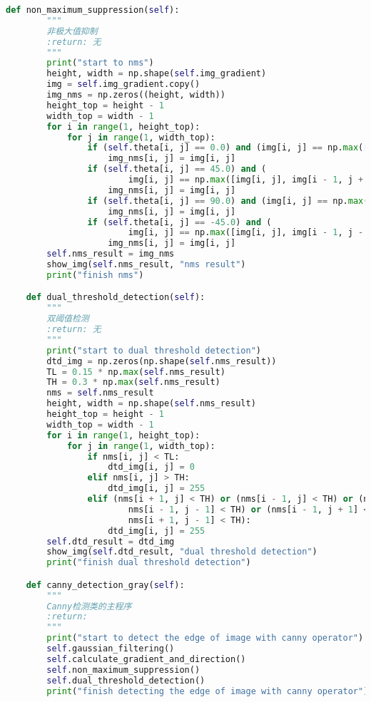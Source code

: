 \documentclass{hitreport}
\begin{document}
\begin{appendices}
\begin{lstlisting}[language=python]
    def non_maximum_suppression(self):
        """
        非极大值抑制
        :return: 无
        """
        print("start to nms")
        height, width = np.shape(self.img_gradient)
        img = self.img_gradient.copy()
        img_nms = np.zeros((height, width))
        height_top = height - 1
        width_top = width - 1
        for i in range(1, height_top):
            for j in range(1, width_top):
                if (self.theta[i, j] == 0.0) and (img[i, j] == np.max([img[i, j], img[i + 1, j], img[i - 1, j]])):
                    img_nms[i, j] = img[i, j]
                if (self.theta[i, j] == 45.0) and (
                        img[i, j] == np.max([img[i, j], img[i - 1, j + 1], img[i + 1, j - 1]])):
                    img_nms[i, j] = img[i, j]
                if (self.theta[i, j] == 90.0) and (img[i, j] == np.max([img[i, j], img[i, j + 1], img[i, j - 1]])):
                    img_nms[i, j] = img[i, j]
                if (self.theta[i, j] == -45.0) and (
                        img[i, j] == np.max([img[i, j], img[i - 1, j - 1], img[i + 1, j + 1]])):
                    img_nms[i, j] = img[i, j]
        self.nms_result = img_nms
        show_img(self.nms_result, "nms result")
        print("finish nms")

    def dual_threshold_detection(self):
        """
        双阈值检测
        :return: 无
        """
        print("start to dual threshold detection")
        dtd_img = np.zeros(np.shape(self.nms_result))
        TL = 0.15 * np.max(self.nms_result)
        TH = 0.3 * np.max(self.nms_result)
        nms = self.nms_result
        height, width = np.shape(self.nms_result)
        height_top = height - 1
        width_top = width - 1
        for i in range(1, height_top):
            for j in range(1, width_top):
                if nms[i, j] < TL:
                    dtd_img[i, j] = 0
                elif nms[i, j] > TH:
                    dtd_img[i, j] = 255
                elif (nms[i + 1, j] < TH) or (nms[i - 1, j] < TH) or (nms[i, j + 1] < TH) or (nms[i, j - 1] < TH) or (
                        nms[i - 1, j - 1] < TH) or (nms[i - 1, j + 1] < TH) or (nms[i + 1, j + 1] < TH) or (
                        nms[i + 1, j - 1] < TH):
                    dtd_img[i, j] = 255
        self.dtd_result = dtd_img
        show_img(self.dtd_result, "dual threshold detection")
        print("finish dual threshold detection")

    def canny_detection_gray(self):
        """
        Canny检测类的主程序
        :return:
        """
        print("start to detect the edge of image with canny operator")
        self.gaussian_filtering()
        self.calculate_gradient_and_direction()
        self.non_maximum_suppression()
        self.dual_threshold_detection()
        print("finish detecting the edge of image with canny operator")



\end{lstlisting}
\end{appendices}
\end{document}
